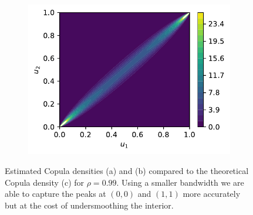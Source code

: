\documentclass[../Thesis.tex]{subfiles}
\begin{document}
\begin{figure}[H]
    \begin{subfigure}[t]{0.49\textwidth}
        \centering
        \includegraphics[width=\linewidth]{figures/MI estimation/theoretical gaussian copula - rho 0.99 - comparison of methods.pdf}
        \caption{}
        \label{subfig:Gaussian copula density example}
    \end{subfigure}
    \caption{Estimated Copula densities (a) and (b) compared to the theoretical Copula density (c) for $\rho = 0.99$. Using a smaller bandwidth we are able to capture the peaks at $(0,0)$ and $(1,1)$ more accurately but at the cost of undersmoothing the interior.}
    \label{fig:density estimate for Jones 1993 and theoretical copula rho 0.99}
\end{figure}









\newpage
\end{document}
